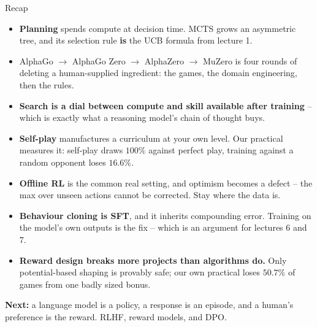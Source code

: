 \documentclass[aspectratio=169]{beamer}
\begin{document}
\begin{frame}{Recap}
  \footnotesize
  \begin{itemize}\itemsep4pt
    \item \textbf{Planning} spends compute at decision time. MCTS grows an asymmetric tree, and
          its selection rule \textbf{is} the UCB formula from lecture 1.
    \item AlphaGo $\to$ AlphaGo Zero $\to$ AlphaZero $\to$ MuZero is four rounds of deleting a
          human-supplied ingredient: the games, the domain engineering, then the rules.
    \item \textbf{Search is a dial between compute and skill available after training} -- which
          is exactly what a reasoning model's chain of thought buys.
    \item \textbf{Self-play} manufactures a curriculum at your own level. Our practical measures
          it: self-play draws $100\%$ against perfect play, training against a random opponent
          loses $16.6\%$.
    \item \textbf{Offline RL} is the common real setting, and optimism becomes a defect -- the
          max over unseen actions cannot be corrected. Stay where the data is.
    \item \textbf{Behaviour cloning is SFT}, and it inherits compounding error. Training on the
          model's own outputs is the fix -- which is an argument for lectures 6 and 7.
    \item \textbf{Reward design breaks more projects than algorithms do.} Only potential-based
          shaping is provably safe; our own practical loses $50.7\%$ of games from one badly
          sized bonus.
  \end{itemize}

  \vskip 4pt
  \begin{tcolorbox}[colback=paramgreen!8, colframe=paramgreen, boxrule=0.6pt, arc=2pt]
    \footnotesize
    \textbf{Next:} a language model is a policy, a response is an episode, and a human's
    preference is the reward. RLHF, reward models, and DPO.
  \end{tcolorbox}
\end{frame}
\end{document}
